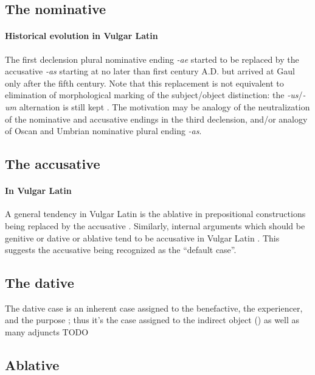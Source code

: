\documentclass[a4paper, oneside, 12pt]{report}
\newcommand*{\citepage}[1]{p.~{#1}}
\newcommand{\form}[1]{\emph{#1}}
\begin{document}
\subsection{The nominative}

\paragraph*{Historical evolution in Vulgar Latin}
\label{sec:noun.case.nominative.vulgar}
The first declension plural nominative ending \form{-ae}
started to be replaced by the accusative \form{-as} starting at no later than first century A.D.
but arrived at Gaul only after the fifth century.
Note that this replacement is not equivalent to elimination of
morphological marking of the subject/object distinction:
the \form{-us}/\form{-um} alternation is still kept
\citep[\citepage{55}]{herman2010vulgar}.
The motivation may be analogy of the neutralization 
of the nominative and accusative endings in the third declension,
and/or analogy of Oscan and Umbrian nominative plural ending \form{-as}.

\subsection{The accusative}

\paragraph*{In Vulgar Latin}
\label{sec:noun.case.accusative.vulgar}
A general tendency in Vulgar Latin is the ablative in prepositional constructions 
being replaced by the accusative \citep[\citepage{53}]{herman2010vulgar}.
Similarly, internal arguments which should be genitive or dative or ablative
tend to be accusative in Vulgar Latin
\citep[\citepage{54}]{herman2010vulgar}.
This suggests the accusative being recognized as the ``default case''.

\subsection{The dative}\label{sec:dative-distribution}

The dative case is an inherent case assigned to the benefactive, the experiencer, and the purpose
\citep[\citepage{251}]{oniga2014latin};
thus it's the case assigned to the indirect object ()
as well as many adjuncts TODO

\subsection{Ablative}
\end{document}
